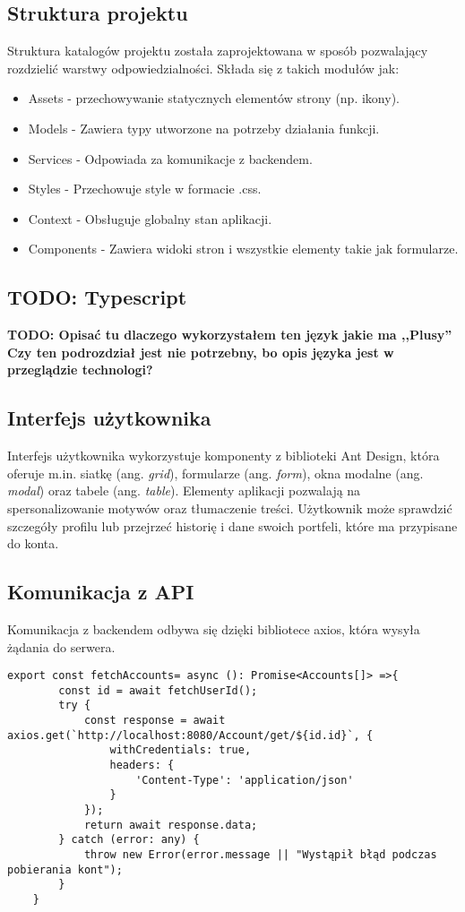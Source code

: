 \subsection*{Struktura projektu}
Struktura katalogów projektu została zaprojektowana w sposób pozwalający rozdzielić warstwy odpowiedzialności. Składa się z takich modułów jak:
\begin{itemize}
	\item Assets - przechowywanie statycznych elementów strony (np. ikony).
	\item Models - Zawiera typy utworzone na potrzeby działania funkcji.
	\item Services - Odpowiada za komunikacje z backendem.
	\item Styles - Przechowuje style w formacie .css.
	\item Context - Obsługuje globalny stan aplikacji.
	\item Components - Zawiera widoki stron i wszystkie elementy takie jak formularze.
\end{itemize}
\subsection*{TODO: Typescript}
\textbf{TODO: Opisać tu dlaczego wykorzystałem ten język jakie ma ,,Plusy''
Czy ten podrozdział jest nie potrzebny, bo opis języka jest w przeglądzie technologi? }
\subsection*{Interfejs użytkownika}
Interfejs użytkownika wykorzystuje komponenty z biblioteki Ant Design, która oferuje m.in. siatkę (ang. \textit{grid}), formularze (ang. \textit{form}), okna modalne (ang. \textit{modal}) oraz tabele (ang. \textit{table}). Elementy aplikacji pozwalają na spersonalizowanie motywów oraz tłumaczenie treści. Użytkownik może sprawdzić szczegóły profilu lub przejrzeć historię i dane swoich portfeli, które ma przypisane do konta.
\subsection*{Komunikacja z API}
Komunikacja z backendem odbywa się dzięki bibliotece axios, która wysyła żądania do serwera. 
\begin{lstlisting}[caption={Funkcja wyszukująca wszystkie konta użytkownika}, label={lst:TS-service1}]
	export const fetchAccounts= async (): Promise<Accounts[]> =>{
		const id = await fetchUserId();
		try {
			const response = await axios.get(`http://localhost:8080/Account/get/${id.id}`, {
				withCredentials: true,
				headers: {
					'Content-Type': 'application/json'
				}
			});
			return await response.data;
		} catch (error: any) {
			throw new Error(error.message || "Wystąpił błąd podczas pobierania kont");
		}
	}
\end{lstlisting}

